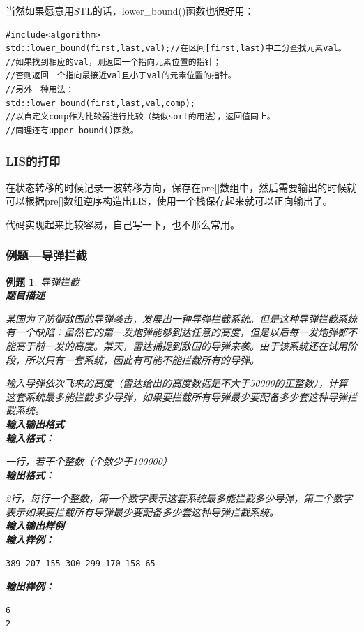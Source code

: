 \documentclass{article}
\newtheorem{example}{例题}[subsection]
\theoremstyle{nonumberplain}
\begin{document}
当然如果愿意用STL的话，lower\_bound()函数也很好用：

\begin{verbatim}
#include<algorithm>
std::lower_bound(first,last,val);//在区间[first,last)中二分查找元素val。
//如果找到相应的val，则返回一个指向元素位置的指针；
//否则返回一个指向最接近val且小于val的元素位置的指针。
//另外一种用法：
std::lower_bound(first,last,val,comp);
//以自定义comp作为比较器进行比较（类似sort的用法），返回值同上。
//同理还有upper_bound()函数。
\end{verbatim}
\subsubsection{LIS的打印}
在状态转移的时候记录一波转移方向，保存在pre[]数组中，然后需要输出的时候就可以根据pre[]数组逆序构造出LIS，使用一个栈保存起来就可以正向输出了。

代码实现起来比较容易，自己写一下，也不那么常用。
\subsubsection{例题---导弹拦截}
\begin{example}导弹拦截\\
	\textbf{题目描述}

	某国为了防御敌国的导弹袭击，发展出一种导弹拦截系统。但是这种导弹拦截系统有一个缺陷：虽然它的第一发炮弹能够到达任意的高度，但是以后每一发炮弹都不能高于前一发的高度。某天，雷达捕捉到敌国的导弹来袭。由于该系统还在试用阶段，所以只有一套系统，因此有可能不能拦截所有的导弹。

	输入导弹依次飞来的高度（雷达给出的高度数据是不大于50000的正整数），计算这套系统最多能拦截多少导弹，如果要拦截所有导弹最少要配备多少套这种导弹拦截系统。\\
	\textbf{输入输出格式}
	\ \\
	\textbf{输入格式：}

	一行，若干个整数（个数少于100000）
	\ \\
	\textbf{输出格式：}

	2行，每行一个整数，第一个数字表示这套系统最多能拦截多少导弹，第二个数字表示如果要拦截所有导弹最少要配备多少套这种导弹拦截系统。
	\ \\
	\textbf{输入输出样例}
	\ \\
	\textbf{输入样例：}
	\begin{verbatim}
389 207 155 300 299 170 158 65
\end{verbatim}
	\textbf{输出样例：}
	\begin{verbatim}
6
2
\end{verbatim}
\end{example}
\end{document}
